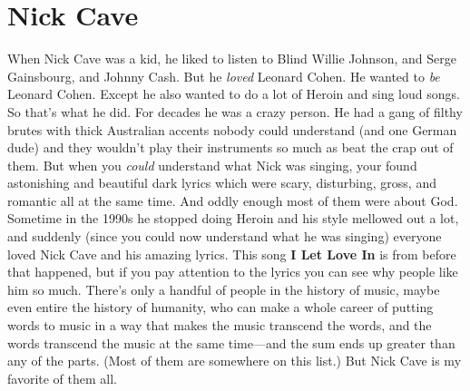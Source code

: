 \documentclass[letterpaper,single]{article}
\begin{document}
\section{Nick Cave}
When Nick Cave was a kid, he liked to listen to Blind Willie Johnson,
and Serge Gainsbourg, and Johnny Cash. But he \emph{loved} Leonard
Cohen. He wanted to \emph{be} Leonard Cohen. Except he also wanted to
do a lot of Heroin and sing loud songs. So that's what he did. For
decades he was a crazy person. He had a gang of filthy brutes with
thick Australian accents nobody could understand (and one German dude)
and they wouldn't play their instruments so much as beat the crap out
of them. But when you \emph{could} understand what Nick was singing,
your found astonishing and beautiful dark lyrics which were scary,
disturbing, gross, and romantic all at the same time. And oddly enough
most of them were about God. Sometime in the 1990s he stopped doing
Heroin and his style mellowed out a lot, and suddenly (since you could
now understand what he was singing) everyone loved Nick Cave and his
amazing lyrics. This song \textbf{I Let Love In} is from before that
happened, but if you pay attention to the lyrics you can see why people
like him so much. There's only a handful of people in the history of
music, maybe even entire the history of humanity, who can make a whole
career of putting words to music in a way that makes the music transcend
the words, and the words transcend the music at the same time---and the
sum ends up greater than any of the parts. (Most of them are somewhere
on this list.) But Nick Cave is my favorite of them all.
\end{document}
